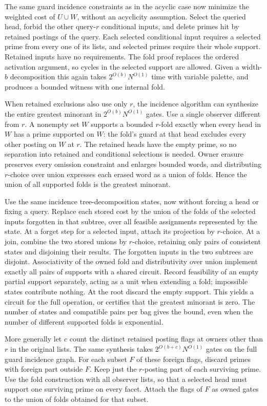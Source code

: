 The same guard incidence constraints as in
the acyclic case now minimize the weighted
cost of $U\cup W$, without an acyclicity
assumption. Select the queried head, forbid
the other query-$r$ conditional inputs,
and delete primes hit by retained postings
of the query. Each selected conditional
input requires a selected prime from every
one of its lists, and selected primes require
their whole support. Retained inputs have no
requirements. The fold proof replaces the
ordered activation argument, so cycles in
the selected support are allowed. Given a
width-$b$ decomposition this again takes
$2^{O(b)}N^{O(1)}$ time with variable palette,
and produces a bounded witness with one
internal fold.

When retained exclusions also use only $r$,
the incidence algorithm can synthesize the
entire greatest minorant in $2^{O(b)}N^{O(1)}$
gates. Use a single observer different from
$r$. A nonempty set $W$ supports a bounded
$r$-fold exactly when every head in $W$ has
a prime supported on $W$: the fold's guard
at that head excludes every other posting
on $W$ at $r$. The retained heads have the
empty prime, so no separation into retained
and conditional selections is needed. Owner
erasure preserves every omission constraint
and enlarges bounded words, and distributing
$r$-choice over union expresses each erased
word as a union of folds. Hence the union of
all supported folds is the greatest minorant.

Use the same incidence tree-decomposition
states, now without forcing a head or fixing
a query. Replace each stored cost by the union
of the folds of the selected inputs forgotten
in that subtree, over all feasible assignments
represented by the state. At a forget step for
a selected input, attach its projection by
$r$-choice. At a join, combine the two stored
unions by $r$-choice, retaining only pairs of
consistent states and disjoining their
results. The forgotten inputs in the two
subtrees are disjoint. Associativity of the
owned fold and distributivity over union
implement exactly all pairs of supports
with a shared circuit. Record feasibility
of an empty partial support separately,
acting as a unit when extending a fold;
impossible states contribute nothing.
At the root discard the empty support.
This yields a circuit for the full operation,
or certifies that the greatest minorant is
zero. The number of states and compatible
pairs per bag gives the bound, even when
the number of different supported folds
is exponential.

More generally let $c$ count the distinct
retained posting flags at owners other than
$r$ in the original lists. The same synthesis
takes $2^{O(b+c)}N^{O(1)}$ gates on the full
guard incidence graph. For each subset $F$
of these foreign flags, discard primes with
foreign part outside $F$. Keep just the
$r$-posting part of each surviving prime.
Use the fold construction with all observer
lists, so that a selected head must support
one surviving prime on every facet. Attach
the flags of $F$ as owned gates to the union
of folds obtained for that subset.

